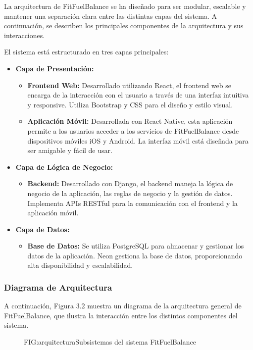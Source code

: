 La arquitectura de FitFuelBalance se ha diseñado para ser modular, escalable y mantener una separación clara entre las distintas capas del sistema. A continuación, se describen los principales componentes de la arquitectura y sus interacciones.

El sistema está estructurado en tres capas principales: 

\begin{itemize}
    \item \textbf{Capa de Presentación:} 
    \begin{itemize}
        \item \textbf{Frontend Web:} Desarrollado utilizando React, el frontend web se encarga de la interacción con el usuario a través de una interfaz intuitiva y responsive. Utiliza Bootstrap y CSS para el diseño y estilo visual.
        \item \textbf{Aplicación Móvil:} Desarrollada con React Native, esta aplicación permite a los usuarios acceder a los servicios de FitFuelBalance desde dispositivos móviles iOS y Android. La interfaz móvil está diseñada para ser amigable y fácil de usar.
    \end{itemize}
    
    \item \textbf{Capa de Lógica de Negocio:} 
    \begin{itemize}
        \item \textbf{Backend:} Desarrollado con Django, el backend maneja la lógica de negocio de la aplicación, las reglas de negocio y la gestión de datos. Implementa APIs RESTful para la comunicación con el frontend y la aplicación móvil.
    \end{itemize}
    
    \item \textbf{Capa de Datos:} 
    \begin{itemize}
        \item \textbf{Base de Datos:} Se utiliza PostgreSQL para almacenar y gestionar los datos de la aplicación. Neon gestiona la base de datos, proporcionando alta disponibilidad y escalabilidad.
    \end{itemize}
    
\end{itemize}

\subsubsection{Diagrama de Arquitectura}
    A continuación, Figura 3.2 muestra un diagrama de la arquitectura general de FitFuelBalance, que ilustra la interacción entre los distintos componentes del sistema.
    \begin{figure}[Distribución Arquitectura]{FIG:arquitectura}{Subsistemas del sistema FitFuelBalance}
    \end{figure}

